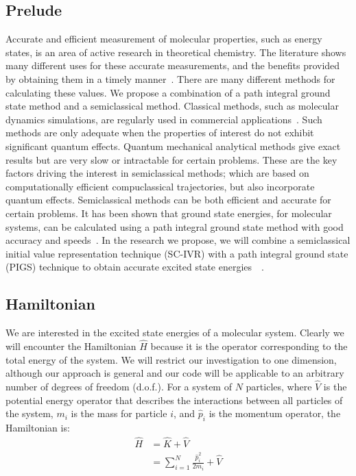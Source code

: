 \documentclass[12pt,letterpaper,oneside,final,titlepage]{article}               %
\numberwithin{equation}{section} %
\begin{document}
\subsection{Prelude}
Accurate and efficient measurement of molecular properties, such as energy states, is an area of active research in theoretical chemistry. 
The literature shows many different uses for these accurate measurements, and the benefits provided by obtaining them in a timely manner~\cite{goodfellow1990molecular}. 
There are many different methods for calculating these values. 
We propose a combination of a path integral ground state method and a semiclassical method. 
Classical methods, such as molecular dynamics simulations, are regularly used in commercial applications~\cite{pasquarello1998interface}. 
Such methods are only adequate when the properties of interest do not exhibit significant quantum effects. 
Quantum mechanical analytical methods give exact results but are very slow or intractable for certain problems. 
These are the key factors driving the interest in semiclassical methods; which are based on computationally efficient compuclassical trajectories, but also incorporate quantum effects. 
Semiclassical methods can be both efficient and accurate for certain problems. \newline
It has been shown that ground state energies, for molecular systems, can be calculated using a path integral ground state method with good accuracy and speeds~\cite{sarsa2000path}. 
In the research we propose, we will combine a semiclassical initial value representation technique (SC-IVR) with a path integral 
ground state (PIGS) technique to obtain accurate excited state energies~\cite{issack2007semiclassical}~\cite{schmidt2014inclusion}.

\newpage

\subsection{Hamiltonian}
We are interested in the excited state energies of a molecular system.
Clearly we will encounter the Hamiltonian $\hat{H}$ because it is the operator corresponding to the total energy of the system.
We will restrict our investigation to one dimension, although our approach is general and our code will be applicable
to an arbitrary number of degrees of freedom (d.o.f.).
For a system of $N$ particles, where $\hat{V}$ is the potential energy operator that describes the interactions between 
all particles of the system, $m_{i}$ is the mass for particle $i$, and $\hat{p}_{i}$ is the momentum operator, the Hamiltonian is:
\begin{align}
    \hat{H} &= \hat{K} + \hat{V}
    \\      &= \sum_{i=1}^{N}\frac{\hat{p}_{i}^2}{2m_{i}} + \hat{V}
\end{align}
\end{document}
